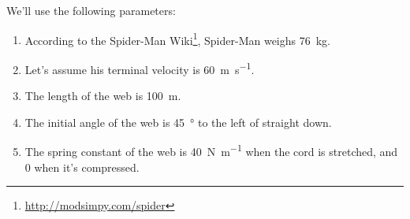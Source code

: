 \documentclass[main.tex]{subfiles}
\begin{document}
We'll use the following parameters:


\begin{enumerate}

\item According to the Spider-Man Wiki\footnote{\url{http://modsimpy.com/spider}}, Spider-Man weighs \SI{76}{\kg}.

\item
  Let's assume his terminal velocity is \SI{60}{\meter\per\second}.


\item
  The length of the web is \SI{100}{\meter}.

\item
  The initial angle of the web is \SI{45}{\degree} to the left of straight
  down.

\item
  The spring constant of the web is \SI{40}{\newton\per\meter} when the cord is stretched, and 0 when it's compressed.
  

\end{enumerate}
\end{document}
